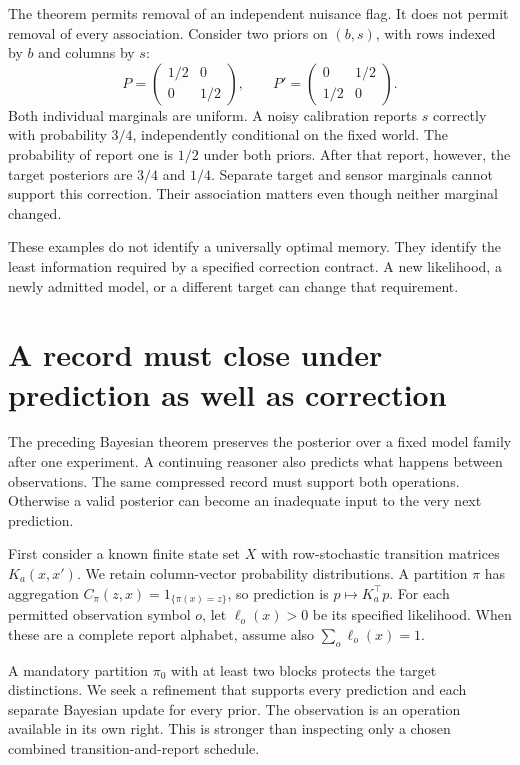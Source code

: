 The theorem permits removal of an independent nuisance flag. It does not permit removal of every association. Consider two priors on $(b,s)$, with rows indexed by $b$ and columns by $s$:
\[
P=\begin{pmatrix}1/2&0\\0&1/2\end{pmatrix},\qquad
P'=\begin{pmatrix}0&1/2\\1/2&0\end{pmatrix}.
\]
Both individual marginals are uniform. A noisy calibration reports $s$ correctly with probability $3/4$, independently conditional on the fixed world. The probability of report one is $1/2$ under both priors. After that report, however, the target posteriors are $3/4$ and $1/4$. Separate target and sensor marginals cannot support this correction. Their association matters even though neither marginal changed.

These examples do not identify a universally optimal memory. They identify the least information required by a specified correction contract. A new likelihood, a newly admitted model, or a different target can change that requirement.


\section{A record must close under prediction as well as correction}
The preceding Bayesian theorem preserves the posterior over a fixed model family after one experiment. A continuing reasoner also predicts what happens between observations. The same compressed record must support both operations. Otherwise a valid posterior can become an inadequate input to the very next prediction.

First consider a known finite state set $X$ with row-stochastic transition matrices $K_a(x,x')$. We retain column-vector probability distributions. A partition $\pi$ has aggregation $C_\pi(z,x)=1_{\{\pi(x)=z\}}$, so prediction is $p\mapsto K_a^\top p$. For each permitted observation symbol $o$, let $\ell_o(x)>0$ be its specified likelihood. When these are a complete report alphabet, assume also $\sum_o\ell_o(x)=1$.

A mandatory partition $\pi_0$ with at least two blocks protects the target distinctions. We seek a refinement that supports every prediction and each separate Bayesian update for every prior. The observation is an operation available in its own right. This is stronger than inspecting only a chosen combined transition-and-report schedule.


